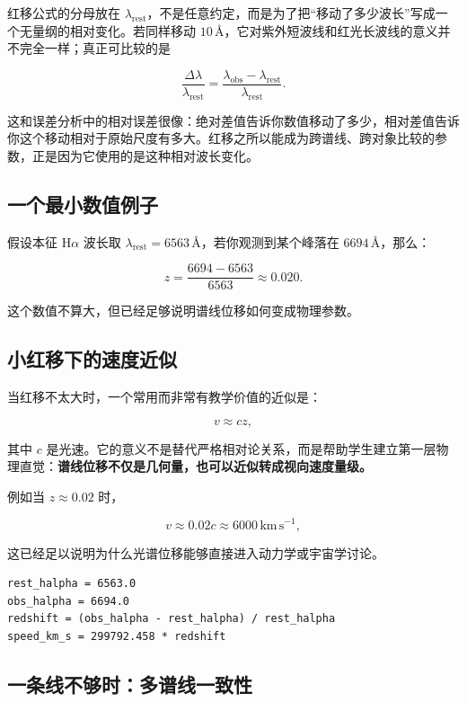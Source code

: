 红移公式的分母放在 $\lambda_{\mathrm{rest}}$，不是任意约定，而是为了把“移动了多少波长”写成一个无量纲的相对变化。若同样移动 $10\,\text{\AA}$，它对紫外短波线和红光长波线的意义并不完全一样；真正可比较的是

\[
\frac{\Delta \lambda}{\lambda_{\mathrm{rest}}}
= \frac{\lambda_{\mathrm{obs}}-\lambda_{\mathrm{rest}}}
{\lambda_{\mathrm{rest}}}.
\]

这和误差分析中的相对误差很像：绝对差值告诉你数值移动了多少，相对差值告诉你这个移动相对于原始尺度有多大。红移之所以能成为跨谱线、跨对象比较的参数，正是因为它使用的是这种相对波长变化。

\subsection{一个最小数值例子}

假设本征 H$\alpha$ 波长取 $\lambda_{\mathrm{rest}} = 6563\,\text{\AA}$，若你观测到某个峰落在 $6694\,\text{\AA}$，那么：

\[
z = \frac{6694 - 6563}{6563} \approx 0.020.
\]

这个数值不算大，但已经足够说明谱线位移如何变成物理参数。

\subsection{小红移下的速度近似}

当红移不太大时，一个常用而非常有教学价值的近似是：

\[
v \approx cz,
\]

其中 $c$ 是光速。它的意义不是替代严格相对论关系，而是帮助学生建立第一层物理直觉：\textbf{谱线位移不仅是几何量，也可以近似转成视向速度量级。}

例如当 $z \approx 0.02$ 时，

\[
v \approx 0.02c \approx 6000\,\mathrm{km\,s^{-1}},
\]

这已经足以说明为什么光谱位移能够直接进入动力学或宇宙学讨论。

\begin{examplebox}[最小红移计算]
\begin{lstlisting}[style=pythonstyle]
rest_halpha = 6563.0
obs_halpha = 6694.0
redshift = (obs_halpha - rest_halpha) / rest_halpha
speed_km_s = 299792.458 * redshift
\end{lstlisting}
\end{examplebox}

\subsection{一条线不够时：多谱线一致性}

